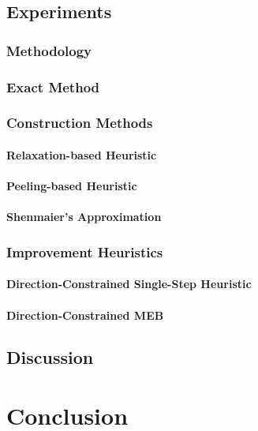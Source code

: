 \documentclass[11pt,twoside]{report}
\theoremstyle{definition}
\numberwithin{theorem}{section}
\numberwithin{definition}{section}
\numberwithin{lemma}{section}
\numberwithin{proposition}{section}
\numberwithin{equation}{section}
\begin{document}
\section{Experiments}
\subsection{Methodology}
\subsection{Exact Method}\label{exact benchmarks}
\subsection{Construction Methods}
\subsubsection{Relaxation-based Heuristic}
\subsubsection{Peeling-based Heuristic}
\subsubsection{Shenmaier's Approximation}

\subsection{Improvement Heuristics}
\subsubsection{Direction-Constrained Single-Step Heuristic}
\subsubsection{Direction-Constrained MEB}

\section{Discussion}

\chapter{Conclusion}
\end{document}

